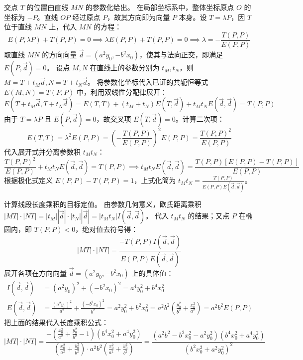 \begin{solution}
交点 $T$ 的位置由直线 $MN$ 的参数化给出。
在局部坐标系中，整体坐标原点 $O$ 的坐标为 $-P$。直线 $OP$ 经过原点 $P$，故其方向即为向量 $P$ 本身。设 $T = \lambda P$，因 $T$ 位于直线 $MN$ 上，代入 $MN$ 的方程：
$$ E(P, \lambda P) + T(P,P) = 0 \implies \lambda E(P,P) + T(P,P) = 0 \implies \lambda = -\frac{T(P,P)}{E(P,P)} $$
取直线 $MN$ 的方向向量 $\vec{d} = (a^2 y_0, -b^2 x_0)$，使其与法向正交，即满足 $E(P, \vec{d}) = 0$。
设点 $M, N$ 在直线上的参数分别为 $t_M, t_N$，则 $M = T + t_M \vec{d}, N = T + t_N \vec{d}$。
将参数化坐标代入已证的共轭恒等式 $E(M,N) = T(P,P)$ 中，利用双线性分配律展开：
$$ E(T + t_M \vec{d}, T + t_N \vec{d}) = E(T,T) + (t_M + t_N)E(T, \vec{d}) + t_M t_N E(\vec{d}, \vec{d}) = T(P,P) $$
由于 $T = \lambda P$ 且 $E(P, \vec{d}) = 0$，故交叉项 $E(T, \vec{d}) = 0$。计算二次项：
$$ E(T,T) = \lambda^2 E(P,P) = \left( -\frac{T(P,P)}{E(P,P)} \right)^2 E(P,P) = \frac{T(P,P)^2}{E(P,P)} $$
代入展开式并分离参数积 $t_M t_N$：
$$ \frac{T(P,P)^2}{E(P,P)} + t_M t_N E(\vec{d}, \vec{d}) = T(P,P) \implies t_M t_N E(\vec{d}, \vec{d}) = \frac{T(P,P) [E(P,P) - T(P,P)]}{E(P,P)} $$
根据极化式定义 $E(P,P) - T(P,P) = 1$，上式化简为 $t_M t_N = \frac{T(P,P)}{E(P,P) E(\vec{d}, \vec{d})}$。

计算线段长度乘积的目标定值。
由参数几何意义，欧氏距离乘积 $|MT| \cdot |NT| = |t_M| |\vec{d}| \cdot |t_N| |\vec{d}| = |t_M t_N| I(\vec{d}, \vec{d})$。
代入 $t_M t_N$ 的结果；又点 $P$ 在椭圆内，即 $T(P,P) < 0$，绝对值去符号得：
$$ |MT| \cdot |NT| = \frac{-T(P,P) I(\vec{d}, \vec{d})}{E(P,P) E(\vec{d}, \vec{d})} $$
展开各项在方向向量 $\vec{d} = (a^2 y_0, -b^2 x_0)$ 上的具体值：
\begin{align*}
I(\vec{d}, \vec{d}) &= (a^2 y_0)^2 + (-b^2 x_0)^2 = a^4 y_0^2 + b^4 x_0^2 \\
E(\vec{d}, \vec{d}) &= \frac{(a^2 y_0)^2}{a^2} + \frac{(-b^2 x_0)^2}{b^2} = a^2 y_0^2 + b^2 x_0^2 = a^2 b^2 \left( \frac{y_0^2}{b^2} + \frac{x_0^2}{a^2} \right) = a^2 b^2 E(P,P)
\end{align*}
把上面的结果代入长度乘积公式：
$$ |MT| \cdot |NT| = \frac{ -\left( \frac{x_0^2}{a^2} + \frac{y_0^2}{b^2} - 1 \right) (b^4 x_0^2 + a^4 y_0^2) }{ \left( \frac{x_0^2}{a^2} + \frac{y_0^2}{b^2} \right) \cdot a^2 b^2 \left( \frac{x_0^2}{a^2} + \frac{y_0^2}{b^2} \right) } = \frac{ (a^2 b^2 - b^2 x_0^2 - a^2 y_0^2)(b^4 x_0^2 + a^4 y_0^2) }{ (b^2 x_0^2 + a^2 y_0^2)^2 } $$
\end{solution}


